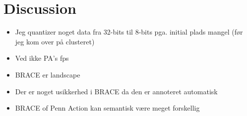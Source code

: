 \documentclass[./main.tex]{subfiles}
\begin{document}
\section{Discussion}
\begin{itemize}
    \item Jeg quantizer noget data fra 32-bits til 8-bits pga. initial plads mangel (før jeg kom over på clusteret)
    \item Ved ikke PA's fps
    \item BRACE er landscape
    \item Der er noget usikkerhed i BRACE da den er annoteret automatisk
    \item BRACE of Penn Action kan semantisk være meget forskellig
\end{itemize}
\end{document}
